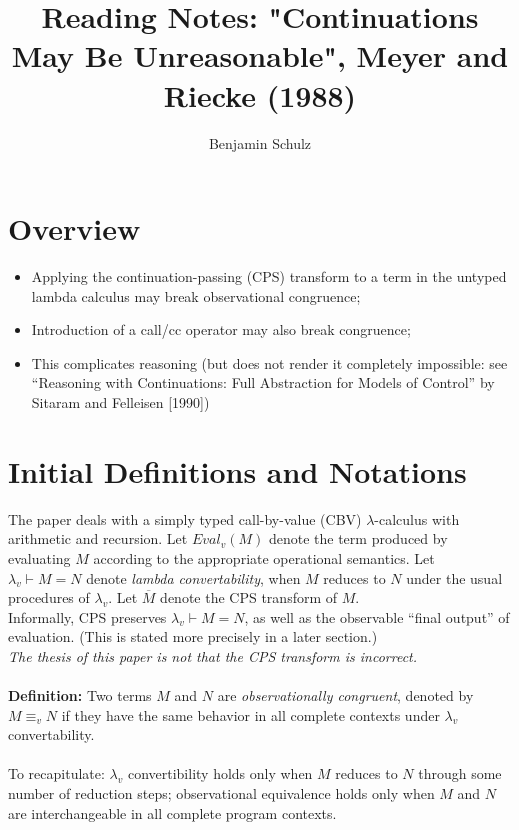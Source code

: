 \documentclass[a4paper,10pt]{article}
\title{Reading Notes: "Continuations May Be Unreasonable", Meyer and Riecke (1988)}
\author{Benjamin Schulz}
\begin{document}
\maketitle

\begin{abstract}

\end{abstract}

\section{Overview}

\begin{itemize}
 \item{Applying the continuation-passing (CPS) transform to a term in the untyped lambda calculus may break observational congruence;}
\item{Introduction of a call/cc operator may also break congruence;}
\item{This complicates reasoning (but does not render it completely impossible: see ``Reasoning with Continuations: Full Abstraction for Models of Control'' by Sitaram and Felleisen [1990])}
\end{itemize}

\section{Initial Definitions and Notations}

The paper deals with a simply typed call-by-value (CBV) $\lambda$-calculus with arithmetic and recursion.  Let $Eval_v(M)$ denote the term produced by evaluating $M$ according to the appropriate operational semantics.  Let $\lambda_v \vdash M = N$ denote \emph{lambda convertability}, when $M$ reduces to $N$ under the usual procedures of $\lambda_v$.  Let $\overline{M}$ denote the CPS transform of $M$.\\
Informally, CPS preserves $\lambda_v \vdash M = N$, as well as the observable ``final output'' of evaluation.  (This is stated more precisely in a later section.)\\
\emph{The thesis of this paper is not that the CPS transform is incorrect.}\\
\\
\textbf{Definition:} Two terms $M$ and $N$ are \emph{observationally congruent}, denoted by $M \equiv_v N$ if they have the same behavior in all complete contexts under $\lambda_v$ convertability.\\
\\
To recapitulate: $\lambda_v$ convertibility holds only when $M$ reduces to $N$ through some number of reduction steps; observational equivalence holds only when $M$ and $N$ are interchangeable in all complete program contexts.\\
\\
\end{document}
